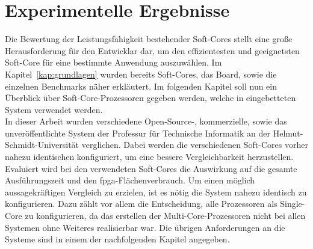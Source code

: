 %
%
%
%
%

\chapter{Experimentelle Ergebnisse}\label{kap:ergebnisse}
Die Bewertung der Leistungsfähigkeit bestehender Soft-Cores stellt eine große Herausforderung für den Entwicklar dar, um den effizientesten und geeignetsten Soft-Core
für eine bestimmte Anwendung auszuwählen. Im Kapitel~\ref{kap:grundlagen} wurden bereits Soft-Cores, das Board, sowie die einzelnen Benchmarks näher erkläutert. Im folgenden Kapitel
soll nun ein Überblick über Soft-Core-Prozessoren gegeben werden, welche in eingebetteten System verwendet werden. \\
In dieser Arbeit wurden verschiedene Open-Source-, kommerzielle, sowie das unveröffentlichte System der Professur für Technische Informatik an der Helmut-Schmidt-Universität verglichen.
Dabei werden die verschiedenen Soft-Cores vorher nahezu identischen konfiguriert, um eine bessere Vergleichbarkeit herzustellen. Evaluiert wird bei den verwendeten Soft-Cores
die Auswirkung auf die gesamte Ausführungszeit und den \ac{fpga}-Flächenverbrauch. Um einen möglich aussagekräftigen Vergleich zu erzielen, ist es nötig die System nahezu identisch zu
konfigurieren. Dazu zählt vor allem die Entscheidung, alle Prozessoren als Single-Core zu konfigurieren, da das erstellen der Multi-Core-Prozessoren nicht bei allen Systemen ohne Weiteres
realisierbar war. Die übrigen Anforderungen an die Systeme sind in einem der nachfolgenden Kapitel angegeben.\\

